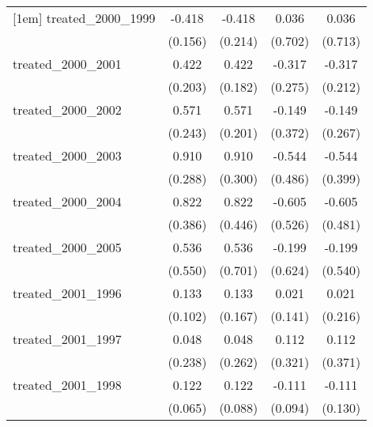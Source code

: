 {\begin{tabular}{l*{4}{c}}
[1em]
treated\_2000\_1999&      -0.418\sym{**} &      -0.418         &       0.036         &       0.036         \\
            &     (0.156)         &     (0.214)         &     (0.702)         &     (0.713)         \\
[1em]
treated\_2000\_2001&       0.422\sym{*}  &       0.422\sym{*}  &      -0.317         &      -0.317         \\
            &     (0.203)         &     (0.182)         &     (0.275)         &     (0.212)         \\
[1em]
treated\_2000\_2002&       0.571\sym{*}  &       0.571\sym{**} &      -0.149         &      -0.149         \\
            &     (0.243)         &     (0.201)         &     (0.372)         &     (0.267)         \\
[1em]
treated\_2000\_2003&       0.910\sym{**} &       0.910\sym{**} &      -0.544         &      -0.544         \\
            &     (0.288)         &     (0.300)         &     (0.486)         &     (0.399)         \\
[1em]
treated\_2000\_2004&       0.822\sym{*}  &       0.822         &      -0.605         &      -0.605         \\
            &     (0.386)         &     (0.446)         &     (0.526)         &     (0.481)         \\
[1em]
treated\_2000\_2005&       0.536         &       0.536         &      -0.199         &      -0.199         \\
            &     (0.550)         &     (0.701)         &     (0.624)         &     (0.540)         \\
[1em]
treated\_2001\_1996&       0.133         &       0.133         &       0.021         &       0.021         \\
            &     (0.102)         &     (0.167)         &     (0.141)         &     (0.216)         \\
[1em]
treated\_2001\_1997&       0.048         &       0.048         &       0.112         &       0.112         \\
            &     (0.238)         &     (0.262)         &     (0.321)         &     (0.371)         \\
[1em]
treated\_2001\_1998&       0.122         &       0.122         &      -0.111         &      -0.111         \\
            &     (0.065)         &     (0.088)         &     (0.094)         &     (0.130)         \\

\end{tabular}}
